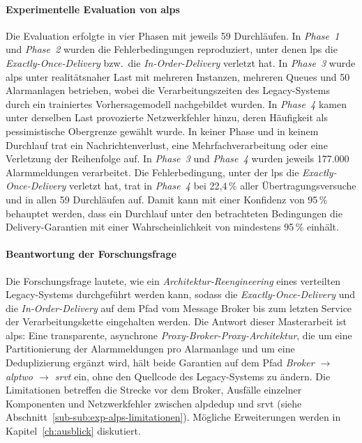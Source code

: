 \paragraph{Experimentelle Evaluation von \gls{alps}} Die Evaluation erfolgte in vier Phasen mit jeweils 59 Durchläufen. In \textit{Phase~1} und \textit{Phase~2} wurden die Fehlerbedingungen reproduziert, unter denen \gls{lps} die \textit{Exactly-Once-Delivery} bzw.~die \textit{In-Order-Delivery} verletzt hat. In \textit{Phase~3} wurde \gls{alps} unter realitätsnaher Last mit mehreren Instanzen, mehreren Queues und 50 Alarmanlagen betrieben, wobei die Verarbeitungszeiten des Legacy-Systems durch ein trainiertes Vorhersagemodell nachgebildet wurden. In \textit{Phase~4} kamen unter derselben Last provozierte Netzwerkfehler hinzu, deren Häufigkeit als pessimistische Obergrenze gewählt wurde. In keiner Phase und in keinem Durchlauf trat ein Nachrichtenverlust, eine Mehrfachverarbeitung oder eine Verletzung der Reihenfolge auf. In \textit{Phase~3} und \textit{Phase~4} wurden jeweils 177.000 Alarmmeldungen verarbeitet. Die Fehlerbedingung, unter der \gls{lps} die \textit{Exactly-Once-Delivery} verletzt hat, trat in \textit{Phase~4} bei 22{,}4\,\% aller Übertragungsversuche und in allen 59 Durchläufen auf. Damit kann mit einer Konfidenz von 95\,\% behauptet werden, dass ein Durchlauf unter den betrachteten Bedingungen die Delivery-Garantien mit einer Wahrscheinlichkeit von mindestens 95\,\% einhält.

\paragraph{Beantwortung der Forschungsfrage} Die Forschungsfrage lautete, wie ein \textit{Architektur-Reengineering} eines verteilten Legacy-Systems durchgeführt werden kann, sodass die \textit{Exactly-Once-Delivery} und die \textit{In-Order-Delivery} auf dem Pfad vom Message Broker bis zum letzten Service der Verarbeitungskette eingehalten werden. Die Antwort dieser Masterarbeit ist \gls{alps}: Eine transparente, asynchrone \textit{Proxy-Broker-Proxy-Architektur}, die um eine Partitionierung der Alarmmeldungen pro Alarmanlage und um eine Deduplizierung ergänzt wird, hält beide Garantien auf dem Pfad \textit{Broker $\rightarrow$ \gls{alptwo} $\rightarrow$ \gls{srvt}} ein, ohne den Quellcode des Legacy-Systems zu ändern. Die Limitationen betreffen die Strecke vor dem Broker, Ausfälle einzelner Komponenten und Netzwerkfehler zwischen \gls{alpdedup} und \gls{srvt} (siehe Abschnitt~\ref{sub-sub:exp-alps-limitationen}). Mögliche Erweiterungen werden in Kapitel~\ref{ch:ausblick} diskutiert.